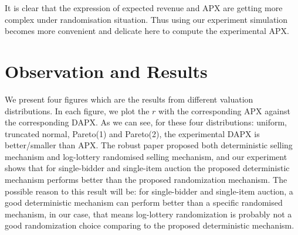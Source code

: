 It is clear that the expression of expected revenue and APX are getting more complex under randomisation situation. Thus using our experiment simulation becomes more convenient and delicate here to compute the experimental APX. 

\section{Observation and Results}
We present four figures which are the results from different valuation distributions. In each figure, we plot the $r$ with the corresponding APX against the corresponding DAPX. As we can see, for these four distributions: uniform, truncated normal, Pareto(1) and Pareto(2), the experimental DAPX is better/smaller than APX. The robust paper proposed both deterministic selling mechanism and log-lottery randomised selling mechanism, and our experiment shows that for single-bidder and single-item auction the proposed deterministic mechanism performs better than the proposed randomization mechanism. The possible reason to this result will be: for single-bidder and single-item auction, a good deterministic mechanism can perform better than a specific randomised mechanism, in our case, that means log-lottery randomization is probably not a good randomization choice comparing to the proposed deterministic mechanism. 

